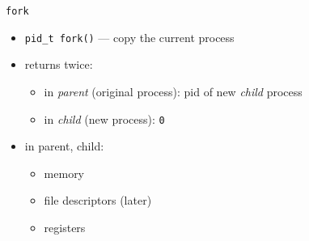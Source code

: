 
\usetikzlibrary{matrix,patterns,arrows.meta,decorations.pathreplacing}
\begin{frame}{\texttt{fork}}
\begin{itemize}
\item \texttt{pid\_t fork()} --- copy the current process
\item returns twice:
    \begin{itemize}
    \item in \textit{parent} (original process): pid of new \textit{child} process
    \item in \textit{child} (new process): \texttt{0}
    \end{itemize}
\item {} in parent, child:
    \begin{itemize}
    \item memory
    \item file descriptors (later)
    \item registers
    \end{itemize}
\end{itemize}
\end{frame}

